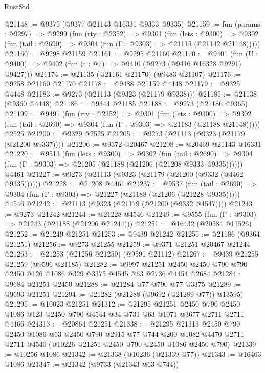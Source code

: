 \begin{lexlean}{RustStd}
\begin{coremodule}
@21148 := @9375 (@9377 @21143 @16331 @9333 @9335)
@21159 := fun (params : @9297) =>
  @9299
    (fun (rty : @2352) =>
    @9301
      (fun (lets : @9300) =>
      @9302 (fun (tail : @2690) => @9304 (fun (Γ : @9303) => @21115 (@21142 @21148)))))
@21160 := @9298 @21159
@21161 := @9295 @21160
@21170 := @9401
    (fun (U : @9400) => @9402 (fun (t : @7) => @9410 (@9273 (@9416 @16328 @9291) @9427)))
@21174 := @21135 (@21161 @21170) (@9483 @21107)
@21176 := @9258 @21160 @21170
@21178 := @9488 @21159 @4448
@21179 := @9325 @4448
@21183 := @9273 (@21113 (@9323 (@21179 @9338)))
@21185 := @21138 (@9360 @4448)
@21186 := @9344 @21185
@21188 := @9273 (@21186 @9365)
@21199 := @9491
    (fun (rty : @2352) =>
    @9301
      (fun (lets : @9300) =>
      @9302 (fun (tail : @2690) => @9304 (fun (Γ : @9303) => @21183 (@21188 @21148)))))
    @2525
@21200 := @9329 @2525
@21205 := @9273 (@21113 (@9323 (@21179 (@21200 @9337))))
@21206 := @9372 @20467
@21208 := @20469 @21143 @16331
@21220 := @9513
    (fun (lets : @9300) =>
    @9302
      (fun (tail : @2690) =>
      @9304 (fun (Γ : @9303) => @21205 (@21188 (@21206 (@21208 @9333 @9335))))))
    @4461
@21227 := @9273 (@21113 (@9323 (@21179 (@21200 (@9332 (@4462 @9335))))))
@21228 := @21208 @4461
@21237 := @9537
    (fun (tail : @2690) => @9304 (fun (Γ : @9303) => @21227 (@21188 (@21206 (@21228 @9335)))))
    @4546
@21242 := @21113 (@9323 (@21179 (@21200 (@9332 @4547))))
@21243 := @9273 @21242
@21244 := @21228 @4546
@21249 := @9555 (fun (Γ : @9303) => @21243 (@21188 (@21206 @21244)))
@21251 := @16432 (@20584 @11526)
@21252 := @21249 @21251
@21253 := @9439 @21242
@21255 := @21186 (@9364 @21251)
@21256 := @9273 @21255
@21259 := @9371 @21251 @20467 @21244
@21263 := @21253 (@21256 @21259) (@9591 @21112)
@21267 := @9439 @21255 @21259 (@9596 @21185)
@21282 := @9997 @21251 @2450 @2450 @790 @790 @2450 @126 @1086 @329 @3375 @4545 @63 @2736 @4454 @2684
@21284 := @9684 @21251 @2450
@21288 := @21284 @77 @790 @77 @3375
@21289 := @9693 @21251
@21294 := @21282 (@21288 (@9692 (@21289 @77)) @13595)
@21295 := @10023 @21251
@21312 := @21295
    @21251
    @2450
    @790
    @2450
    @1086
    @123
    @2450
    @790
    @4544
    @34
    @731
    @63
    @1071
    @3677
    @2711
    @2711
    @4466
@21313 := @20864 @21251
@21338 := @21295
    @21313
    @2450
    @790
    @2450
    @1086
    @63
    @2450
    @790
    @2915
    @77
    @744
    @200
    @1082
    @4470
    @2711
    @2711
    @4540
    (@10226 @21251 @2450 @790 @2450 @1086 @2450 @790)
@21339 := @10256 @1086
@21342 := @21338 (@10236 (@21339 @77))
@21343 := @16463 @1086
@21347 := @21342 (@9733 (@21343 @63 @744))

\end{coremodule}
\end{lexlean}
